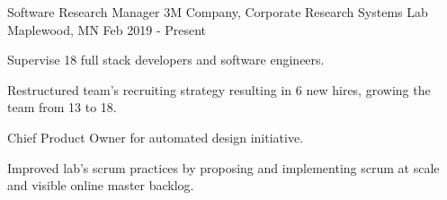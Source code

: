 

\begin{cventries}

  \cventry
    {Software Research Manager} %
    {3M Company, Corporate Research Systems Lab} %
    {Maplewood, MN} %
    {Feb 2019 - Present} %
    {
      \begin{cvitems} %
       \item {Supervise 18 full stack developers and software engineers.}
       \item {Restructured team's recruiting strategy resulting in 6 new hires, growing
           the team from 13 to 18.}
       \item {Chief Product Owner for automated design initiative.}
       \item {Improved lab's scrum practices by proposing and implementing scrum at scale
           and visible online master backlog.}
      \end{cvitems}
    }


\end{cventries}
